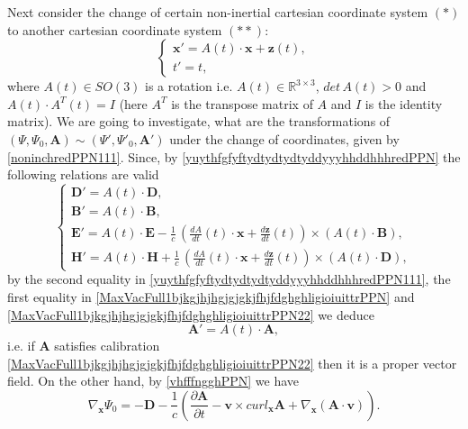 \documentclass{article}
\theoremstyle{definition}
\theoremstyle{remark}
\renewcommand{\vec}[1]{\mathbf{#1}}
\newcommand{\R}{\mathbb{R}}
\newcommand{\er}{\eqref}
\newcommand{\R}{{\mathbb{R}}}
\newcommand{\er}{\eqref}
\begin{document}
Next consider the change of certain non-inertial cartesian
coordinate system $(*)$ to another cartesian coordinate system
$(**)$:
\begin{equation}\label{noninchredPPN111}
\begin{cases}
\vec x'=A(t)\cdot \vec x+\vec z(t),\\
t'=t,
\end{cases}
\end{equation}
where $A(t)\in SO(3)$ is a rotation i.e. $A(t)\in \R^{3\times 3}$,
$det\, A(t)>0$ and $A(t)\cdot A^T(t)=I$ (here $A^T$ is the transpose
matrix of $A$ and $I$ is the identity matrix). We are going to
investigate, what are the transformations of $(\Psi,\Psi_0,\vec
A)\sim(\Psi',\Psi'_0,\vec A')$ under the change of coordinates,
given by \er{noninchredPPN111}. Since, by
\er{yuythfgfyftydtydtydtyddyyyhhddhhhredPPN} the following relations
are valid
\begin{equation}\label{yuythfgfyftydtydtydtyddyyyhhddhhhredPPN111}
\begin{cases}
\vec D'=A(t)\cdot \vec D,\\
\vec B'=A(t)\cdot\vec B,\\
\vec E'=A(t)\cdot\vec E-\frac{1}{c}\,\left(\frac{dA}{dt}(t)\cdot\vec
x+\frac{d\vec z}{dt}(t)\right)\times \left(A(t)\cdot\vec B\right),\\
\vec H'=A(t)\cdot\vec H+\frac{1}{c}\,\left(\frac{dA}{dt}(t)\cdot\vec
x+\frac{d\vec z}{dt}(t)\right)\times \left(A(t)\cdot\vec D\right),
\end{cases}
\end{equation}
by the second equality in
\er{yuythfgfyftydtydtydtyddyyyhhddhhhredPPN111}, the first equality
in \er{MaxVacFull1bjkgjhjhgjgjgkjfhjfdghghligioiuittrPPN} and
\er{MaxVacFull1bjkgjhjhgjgjgkjfhjfdghghligioiuittrPPN22} we deduce
\begin{equation}\label{yuythfgfyftydtydtydtyddyyyhhddhhhredPPN111222}
\vec A'=A(t)\cdot \vec A,
\end{equation}
i.e. if $\vec A$ satisfies calibration
\er{MaxVacFull1bjkgjhjhgjgjgkjfhjfdghghligioiuittrPPN22} then it is
a proper vector field. On the other hand, by \er{vhfffngghPPN} we
have
\begin{equation}\label{vhfffngghPPNjuiuio}
\nabla_{\vec x}\Psi_0= -\vec D-\frac{1}{c}\left(\frac{\partial\vec
A}{\partial t}-\vec v\times curl_{\vec x}\vec A+\nabla_{\vec
x}\left(\vec A\cdot\vec v\right)\right).
\end{equation}
\end{document}
